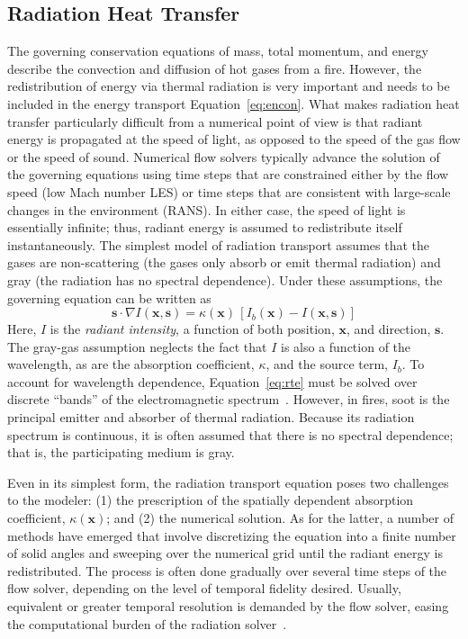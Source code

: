 \documentclass[graybox]{svmult}
\begin{document}
\subsection{Radiation Heat Transfer}

The governing conservation equations of mass, total momentum, and energy describe the convection and diffusion of hot gases from a fire. However, the redistribution of energy via thermal radiation is very important and needs to be included in the energy transport Equation~\ref{eq:encon}. What makes radiation heat transfer particularly difficult from a numerical point of view is that radiant energy is propagated at the speed of light, as opposed to the speed of the gas flow or the speed of sound. Numerical flow solvers typically advance the solution of the governing
equations using time steps that are constrained either by the flow speed (low Mach number LES) or time steps that are consistent with large-scale changes in the environment (RANS). In either case, the speed of light is essentially infinite; thus, radiant energy is assumed to redistribute itself instantaneously. The simplest model of radiation transport assumes that the gases are non-scattering (the gases only absorb or emit thermal radiation) and gray (the radiation has no spectral dependence). Under these assumptions, the governing equation can be written as
\begin{equation}
\mathbf{s} \cdot \nabla I(\mathbf{x},\mathbf{s}) = \kappa(\mathbf{x}) \, \left[ I_b(\mathbf{x}) - I(\mathbf{x},\mathbf{s}) \right]
\label{eq:rte}
\end{equation}
Here, $I$ is the {\em radiant intensity}, a function of both position, $\mathbf{x}$, and direction, $\mathbf{s}$. The gray-gas assumption neglects the fact that $I$ is also a function of the wavelength, as are the absorption coefficient, $\kappa$, and the source term, $I_b$. To account for wavelength dependence, Equation~\ref{eq:rte} must be solved over discrete ``bands'' of the electromagnetic spectrum~\cite{Siegel}. However, in fires, soot is the principal emitter and absorber of thermal radiation. Because its radiation spectrum is continuous, it is often assumed that there is no spectral dependence; that is, the participating medium is gray.

Even in its simplest form, the radiation transport equation poses two challenges to the modeler: (1) the prescription of the spatially dependent absorption coefficient, $\kappa(\mathbf{x})$; and (2) the numerical solution. As for  the latter, a number of methods have emerged that involve discretizing the equation into a finite number of solid angles and sweeping over the numerical grid  until the radiant energy is redistributed. The process is often done gradually over several time steps of the flow solver, depending on the level of temporal fidelity desired. Usually, equivalent or greater temporal resolution is demanded by the flow solver, easing the computational burden of the radiation solver~\cite{Hostikka}.
\end{document}
